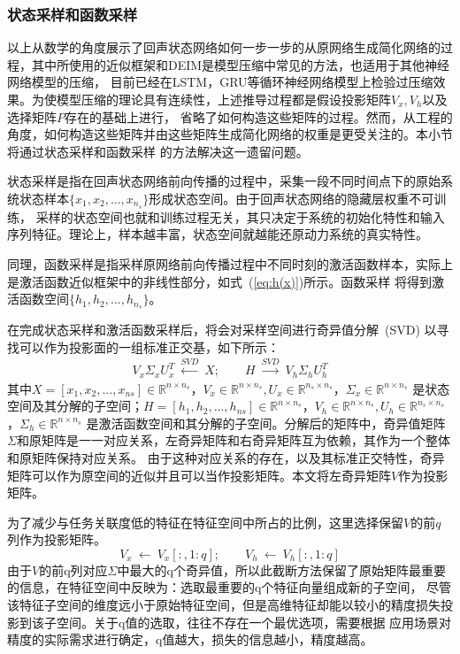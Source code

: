 \subsubsection{状态采样和函数采样}
以上从数学的角度展示了回声状态网络如何一步一步的从原网络生成简化网络的过程，其中所使用的近似框架和DEIM是模型压缩中常见的方法，也适用于其他神经网络模型的压缩，
目前已经在LSTM，GRU等循环神经网络模型上检验过压缩效果。为使模型压缩的理论具有连续性，上述推导过程都是假设投影矩阵\(V_x,V_h\)以及选择矩阵\(P\)存在的基础上进行，
省略了如何构造这些矩阵的过程。然而，从工程的角度，如何构造这些矩阵并由这些矩阵生成简化网络的权重是更受关注的。本小节将通过状态采样和函数采样
的方法解决这一遗留问题。

状态采样是指在回声状态网络前向传播的过程中，采集一段不同时间点下的原始系统状态样本\(\{x_1,x_2,...,x_{n_s}\}\)形成状态空间。由于回声状态网络的隐藏层权重不可训练，
采样的状态空间也就和训练过程无关，其只决定于系统的初始化特性和输入序列特征。理论上，样本越丰富，状态空间就越能还原动力系统的真实特性。

同理，函数采样是指采样原网络前向传播过程中不同时刻的激活函数样本，实际上是激活函数近似框架中的非线性部分，如式~(\ref{eq:h(x)})所示。函数采样
将得到激活函数空间\(\{h_1,h_2,...,h_{n_s}\}\)。

在完成状态采样和激活函数采样后，将会对采样空间进行奇异值分解~(SVD) 以寻找可以作为投影面的一组标准正交基，如下所示：
\begin{equation}
	\begin{split}
		V_x \Sigma_x U_x^T \ \xleftarrow{SVD} \ X;	\qquad	H \ \xrightarrow{SVD} \ V_h \Sigma_h U_h^T 	
	\end{split}
\end{equation}
其中\(X = [x_1,x_2,...,x_{ns}] \in \mathbb{R}^{n \times n_s} \)，\(V_x \in \mathbb{R}^{n \times n_s},U_x \in \mathbb{R}^{n_s \times n_s}\)，\(\Sigma_x \in \mathbb{R}^{n \times n_s}\)
是状态空间及其分解的子空间；\(H = [h_1,h_2,...,h_{ns}] \in \mathbb{R}^{n \times n_s} \)，\(V_h \in \mathbb{R}^{n \times n_s},U_h \in \mathbb{R}^{n_s \times n_s}\)，\(\Sigma_h \in \mathbb{R}^{n \times n_s}\)
是激活函数空间和其分解的子空间。分解后的矩阵中，奇异值矩阵\(\Sigma\)和原矩阵是一一对应关系，左奇异矩阵和右奇异矩阵互为依赖，其作为一个整体和原矩阵保持对应关系。
由于这种对应关系的存在，以及其标准正交特性，奇异矩阵可以作为原空间的近似并且可以当作投影矩阵。本文将左奇异矩阵\(V\)作为投影矩阵。

为了减少与任务关联度低的特征在特征空间中所占的比例，这里选择保留\(V\)的前\(q\)列作为投影矩阵。
\begin{equation}
	V_x \ \leftarrow \ V_x[:,1:q];	\qquad V_h \ \leftarrow \ V_h[:,1:q]
\end{equation}
由于\(V\)的前q列对应\(\Sigma\)中最大的q个奇异值，所以此截断方法保留了原始矩阵最重要的信息，在特征空间中反映为：选取最重要的q个特征向量组成新的子空间，
尽管该特征子空间的维度远小于原始特征空间，但是高维特征却能以较小的精度损失投影到该子空间。关于q值的选取，往往不存在一个最优选项，需要根据
应用场景对精度的实际需求进行确定，q值越大，损失的信息越小，精度越高。

